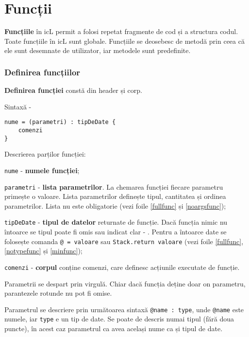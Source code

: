 \section{Funcții}

{\bf Funcțiile} în icL permit a folosi repetat fragmente de cod și a structura codul. Toate funcțiile în icL sunt globale. Funcțiile se deosebesc de metodă prin ceea că ele sunt desemnate de utilizator, iar metodele sunt predefinite.

\subsubsection{Definirea funcțiilor}

{\bf Definirea funcției} constă din header și corp.

\noindent Sintaxă -
\begin{verbatim}
nume = (parametri) : tipDeDate {
	comenzi
}
\end{verbatim}

Descrierea parților funcției:
\begin{icItems}
\item
	\texttt{nume} - {\bf numele funcției};
\item
	\texttt{parametri} - {\bf lista parametrilor}. La chemarea funcției fiecare parametru primește o valoare. Lista parametrilor definește tipul, cantitatea și ordinea parametrilor. Lista nu este obligatorie (vezi foile \ref{fullfunc} și \ref{noargsfunc});
\item
	\texttt{tipDeDate} - {\bf tipul de datelor} returnate de funcție. Dacă funcția nimic nu întoarce se tipul poate fi omis sau indicat clar - \void{}. Pentru a întoarce date se folosește comanda \texttt{@ = valoare} sau \texttt{Stack.return valoare} (vezi foile \ref{fullfunc}, \ref{notypefunc} și \ref{minfunc});
\item
	\texttt{comenzi} - {\bf corpul} conține comenzi, care definesc acțiunile executate de funcție.
\end{icItems}

Parametrii se despart prin virgulă. Chiar dacă funcția deține doar on parametru, parantezele rotunde nu pot fi omise.

Parametrul se descriere prin următoarea sintaxă \texttt{@name : type}, unde \texttt{@name} este numele, iar \texttt{type} e un tip de date. Se poate de descris numai tipul (fără doua puncte), în acest caz parametrul ca avea același nume ca și tipul de date.

